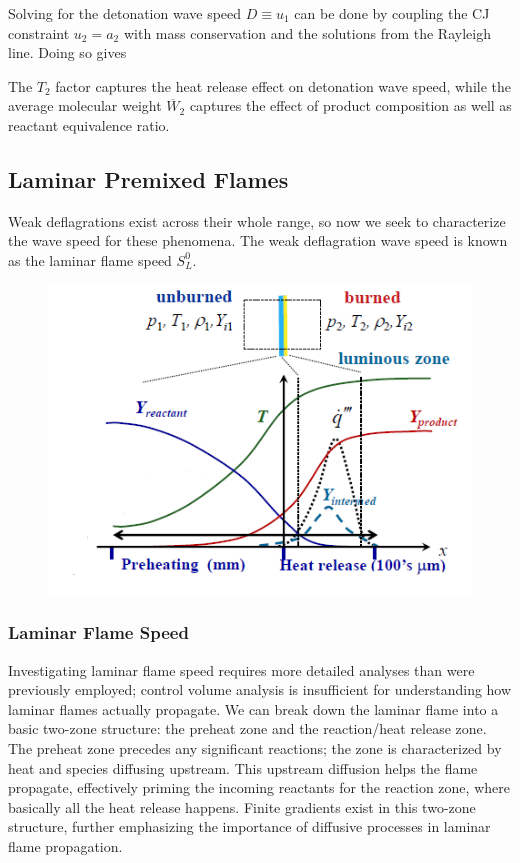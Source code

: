 \documentclass[11pt]{article}
\newcommand{\CenteredBoxed}[1]{\begin{center}\boxed{#1}\end{center}}
\begin{document}
Solving for the detonation wave speed $D\equiv u_1$ can be done by coupling the CJ constraint $u_2=a_2$ with mass conservation and the solutions from the Rayleigh line. Doing so gives
\CenteredBoxed{D=\frac{\gamma_2+1}{\gamma}\sqrt{\frac{\gamma_2T_2R_u}{\overline{W}_2}}}
The $T_2$ factor captures the heat release effect on detonation wave speed, while the average molecular weight $\overline{W}_2$ captures the effect of product composition as well as reactant equivalence ratio.

\subsection{Laminar Premixed Flames}
Weak deflagrations exist across their whole range, so now we seek to characterize the wave speed for these phenomena. The weak deflagration wave speed is known as the laminar flame speed $S_L^0$.
\begin{figure}[h]\centering\includegraphics[scale=0.8]{Graphics/laminar_flame_structure.PNG}\end{figure}

\subsubsection{Laminar Flame Speed}
Investigating laminar flame speed requires more detailed analyses than were previously employed; control volume analysis is insufficient for understanding how laminar flames actually propagate. We can break down the laminar flame into a basic two-zone structure: the preheat zone and the reaction/heat release zone. The preheat zone precedes any significant reactions; the zone is characterized by heat and species diffusing upstream. This upstream diffusion helps the flame propagate, effectively priming the incoming reactants for the reaction zone, where basically all the heat release happens. Finite gradients exist in this two-zone structure, further emphasizing the importance of diffusive processes in laminar flame propagation.\\
\end{document}
